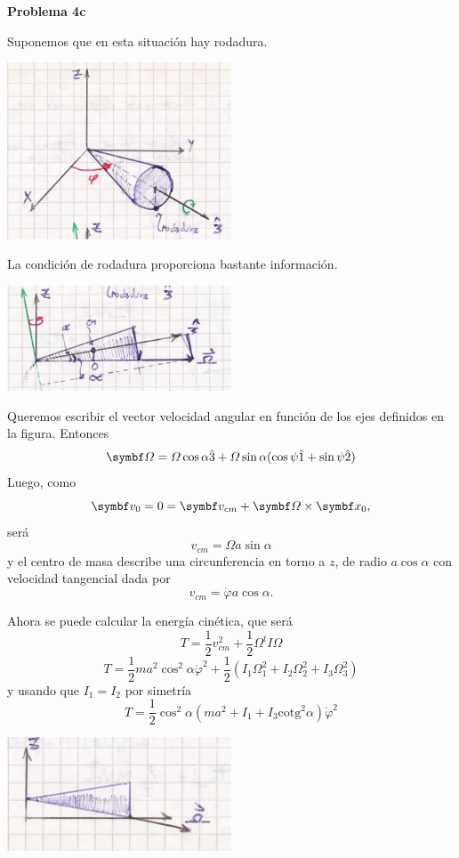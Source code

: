\documentclass[10pt,oneside]{CBFT_book}
\begin{document}
\begin{ejemplo}{\bf Problema 4c}

Suponemos que en esta situación hay rodadura.

\includegraphics[width=0.5\textwidth]{images/fig_mc_cono_rodando_1.jpg}

La condición de rodadura proporciona bastante información.

\includegraphics[width=0.5\textwidth]{images/fig_mc_cono_rodando_2.jpg}

Queremos escribir el vector velocidad angular en función de los ejes definidos en la figura.
Entonces
\[
	\vb{\Omega} = \Omega \cos \alpha \hat{3} + \Omega \sin \alpha ( \cos \psi \hat{1} + \sin \psi \hat{2} )
\]
Luego, como
\[
	\vb{v}_0 = 0 = \vb{v}_{cm} + \vb{\Omega} \times \vb{x}_0,
\]
será
\[
	v_{cm} = \Omega a \sin \alpha
\]
y el centro de masa describe una circunferencia en torno a $z$, de radio $a \cos \alpha$ con velocidad tangencial
dada por 
\[
	v_{cm} = \dot{\varphi} a \cos \alpha.
\]

Ahora se puede calcular la energía cinética, que será 
\[
	T = \frac 1 2 v_{cm}^2 + \frac 1 2 \Omega^t I \Omega 
\]
\[
	T = \frac 1 2 m a^2 \cos^2 \alpha \dot{\varphi}^2 + \frac{1}{2}( I_1\Omega_1^2 + I_2\Omega_2^2 + I_3\Omega_3^2)
\]
y usando que $I_1=I_2$ por simetría
\[
	T = \frac 1 2 \cos^2 \alpha ( ma^2 + I_1 + I_3 \mbox{cotg}^2 \alpha ) \dot{\varphi}^2
\]

\includegraphics[width=0.5\textwidth]{images/fig_mc_cono_rodando_3.jpg}
 
\end{ejemplo}
\end{document}
